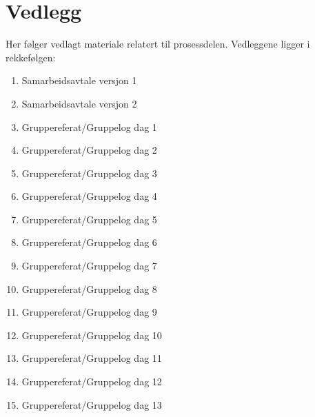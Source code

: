 \chapter{Vedlegg}
Her følger vedlagt materiale relatert til prosessdelen.
Vedleggene ligger i rekkefølgen:
\begin{enumerate}
  \item Samarbeidsavtale versjon 1
  \item Samarbeidsavtale versjon 2
  \item Gruppereferat/Gruppelog dag 1
  \item Gruppereferat/Gruppelog dag 2
  \item Gruppereferat/Gruppelog dag 3
  \item Gruppereferat/Gruppelog dag 4
  \item Gruppereferat/Gruppelog dag 5
  \item Gruppereferat/Gruppelog dag 6
  \item Gruppereferat/Gruppelog dag 7
  \item Gruppereferat/Gruppelog dag 8
  \item Gruppereferat/Gruppelog dag 9
  \item Gruppereferat/Gruppelog dag 10
  \item Gruppereferat/Gruppelog dag 11
  \item Gruppereferat/Gruppelog dag 12
  \item Gruppereferat/Gruppelog dag 13
\end{enumerate}

















